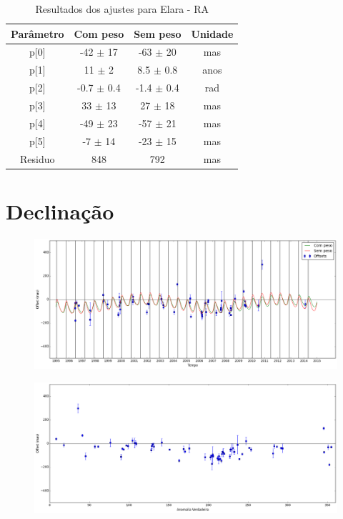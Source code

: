 \documentclass[11pt,a4paper]{report}
\begin{document}
\begin{table}[h!]
\caption{\label{Tab: Elara-RA} Resultados dos ajustes para Elara - RA}
\begin{centering}
\begin{tabular}{cccc}
\hline
\hline
Parâmetro & Com peso & Sem peso & Unidade\tabularnewline
\hline
p[0] & -42 $\pm$ 17 & -63 $\pm$ 20 & mas\\
p[1] & 11 $\pm$ 2 & 8.5 $\pm$ 0.8 & anos\\
p[2] & -0.7 $\pm$ 0.4 & -1.4 $\pm$ 0.4 & rad\\
p[3] & 33 $\pm$ 13 & 27 $\pm$ 18 & mas\\
p[4] & -49 $\pm$ 23 & -57 $\pm$ 21 & mas\\
p[5] & -7 $\pm$ 14 & -23 $\pm$ 15 & mas\\
Residuo & 848 & 792 & mas\\
\hline 
\end{tabular} 
\par\end{centering}
\end{table}

\section*{Declinação}

\begin{figure}[h]
\includegraphics[scale=0.35]{Elara/DEC.png} 
\end{figure}

\begin{figure}[h]
\includegraphics[scale=0.35]{Elara/DEC_anom.png}  
\end{figure}
\end{document}
